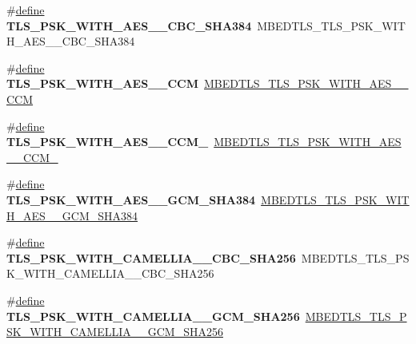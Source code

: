 \begin{DoxyCompactItemize}
\item 
\mbox{\label{compat-1_83_8h_a5a8c3f6ccf5ad9a631482cd9a44226e8}} 
\#\hyperlink{structdefine}{define} {\bfseries T\+L\+S\+\_\+\+P\+S\+K\+\_\+\+W\+I\+T\+H\+\_\+\+A\+E\+S\+\_\+\_\+\+C\+B\+C\+\_\+\+S\+H\+A384}~M\+B\+E\+D\+T\+L\+S\+\_\+\+T\+L\+S\+\_\+\+P\+S\+K\+\_\+\+W\+I\+T\+H\+\_\+\+A\+E\+S\+\_\+\_\+\+C\+B\+C\+\_\+\+S\+H\+A384
\item 
\mbox{\label{compat-1_83_8h_ad4d5a7d1e4654f2ea9b0c12e9d71648a}} 
\#\hyperlink{structdefine}{define} {\bfseries T\+L\+S\+\_\+\+P\+S\+K\+\_\+\+W\+I\+T\+H\+\_\+\+A\+E\+S\+\_\+\_\+\+C\+CM}~\hyperlink{ssl__ciphersuites_8h_ad6ad788d7288c59a5a473450884e3c9d}{M\+B\+E\+D\+T\+L\+S\+\_\+\+T\+L\+S\+\_\+\+P\+S\+K\+\_\+\+W\+I\+T\+H\+\_\+\+A\+E\+S\+\_\+\_\+\+C\+CM}
\item 
\mbox{\label{compat-1_83_8h_af17e9064ddeda1fe2b288576f493dd97}} 
\#\hyperlink{structdefine}{define} {\bfseries T\+L\+S\+\_\+\+P\+S\+K\+\_\+\+W\+I\+T\+H\+\_\+\+A\+E\+S\+\_\+\_\+\+C\+C\+M\+\_}~\hyperlink{ssl__ciphersuites_8h_ab8f3a8b0f488d78fd91c81b7d287a583}{M\+B\+E\+D\+T\+L\+S\+\_\+\+T\+L\+S\+\_\+\+P\+S\+K\+\_\+\+W\+I\+T\+H\+\_\+\+A\+E\+S\+\_\+\_\+\+C\+C\+M\+\_}
\item 
\mbox{\label{compat-1_83_8h_acc44ad6d12ee191dd30d1f3d373b6e4d}} 
\#\hyperlink{structdefine}{define} {\bfseries T\+L\+S\+\_\+\+P\+S\+K\+\_\+\+W\+I\+T\+H\+\_\+\+A\+E\+S\+\_\+\_\+\+G\+C\+M\+\_\+\+S\+H\+A384}~\hyperlink{ssl__ciphersuites_8h_a0cff69d96ab1ee0dd5eaef6fe2a5a592}{M\+B\+E\+D\+T\+L\+S\+\_\+\+T\+L\+S\+\_\+\+P\+S\+K\+\_\+\+W\+I\+T\+H\+\_\+\+A\+E\+S\+\_\+\_\+\+G\+C\+M\+\_\+\+S\+H\+A384}
\item 
\mbox{\label{compat-1_83_8h_a898f6fba67023bcffd118c751c1d52e4}} 
\#\hyperlink{structdefine}{define} {\bfseries T\+L\+S\+\_\+\+P\+S\+K\+\_\+\+W\+I\+T\+H\+\_\+\+C\+A\+M\+E\+L\+L\+I\+A\+\_\+\_\+\+C\+B\+C\+\_\+\+S\+H\+A256}~M\+B\+E\+D\+T\+L\+S\+\_\+\+T\+L\+S\+\_\+\+P\+S\+K\+\_\+\+W\+I\+T\+H\+\_\+\+C\+A\+M\+E\+L\+L\+I\+A\+\_\+\_\+\+C\+B\+C\+\_\+\+S\+H\+A256
\item 
\mbox{\label{compat-1_83_8h_a88a1f43800a010e5fc8d18ac694f5d01}} 
\#\hyperlink{structdefine}{define} {\bfseries T\+L\+S\+\_\+\+P\+S\+K\+\_\+\+W\+I\+T\+H\+\_\+\+C\+A\+M\+E\+L\+L\+I\+A\+\_\+\_\+\+G\+C\+M\+\_\+\+S\+H\+A256}~\hyperlink{ssl__ciphersuites_8h_afec870e616180efaa258455a2c0f72f6}{M\+B\+E\+D\+T\+L\+S\+\_\+\+T\+L\+S\+\_\+\+P\+S\+K\+\_\+\+W\+I\+T\+H\+\_\+\+C\+A\+M\+E\+L\+L\+I\+A\+\_\+\_\+\+G\+C\+M\+\_\+\+S\+H\+A256}

\end{DoxyCompactItemize}
